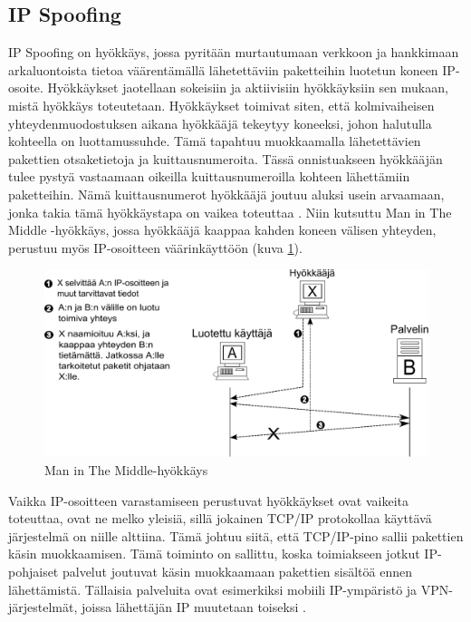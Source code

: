 \subsection{IP Spoofing}

IP Spoofing on hyökkäys, jossa pyritään murtautumaan verkkoon ja hankkimaan
arkaluontoista tietoa väärentämällä lähetettäviin paketteihin luotetun koneen
IP-osoite. Hyökkäykset jaotellaan sokeisiin ja aktiivisiin hyökkäyksiin sen mukaan,
mistä hyökkäys toteutetaan. Hyökkäykset toimivat siten, että kolmivaiheisen yhteydenmuodostuksen aikana
hyökkääjä tekeytyy koneeksi, johon halutulla kohteella on luottamussuhde. Tämä tapahtuu
muokkaamalla lähetettävien pakettien otsaketietoja ja kuittausnumeroita. Tässä onnistuakseen
hyökkääjän tulee pystyä vastaamaan oikeilla kuittausnumeroilla kohteen lähettämiin
paketteihin. Nämä kuittausnumerot hyökkääjä joutuu aluksi usein arvaamaan, jonka takia tämä
hyökkäystapa on vaikea toteuttaa \cite{WEBS}. Niin kutsuttu Man in The Middle -hyökkäys, jossa hyökkääjä 
kaappaa kahden koneen välisen yhteyden, perustuu myös IP-osoitteen väärinkäyttöön (kuva \ref{Man}).

\begin{figure}[ht]
\centering
\includegraphics[width=13cm]{pics/MiTM.pdf}
\caption{Man in The Middle-hyökkäys}
\label{Man}
\end{figure}

Vaikka IP-osoitteen varastamiseen perustuvat hyökkäykset ovat vaikeita toteuttaa,
ovat ne melko yleisiä, sillä jokainen TCP/IP protokollaa käyttävä järjestelmä on niille alttiina. Tämä
johtuu siitä, että TCP/IP-pino sallii pakettien käsin muokkaamisen. Tämä
toiminto on sallittu, koska toimiakseen jotkut IP-pohjaiset palvelut joutuvat
käsin muokkaamaan pakettien sisältöä ennen lähettämistä. Tällaisia palveluita
ovat esimerkiksi mobiili IP-ympäristö ja VPN-järjestelmät, joissa lähettäjän IP
muutetaan toiseksi \cite{DDOS}.

